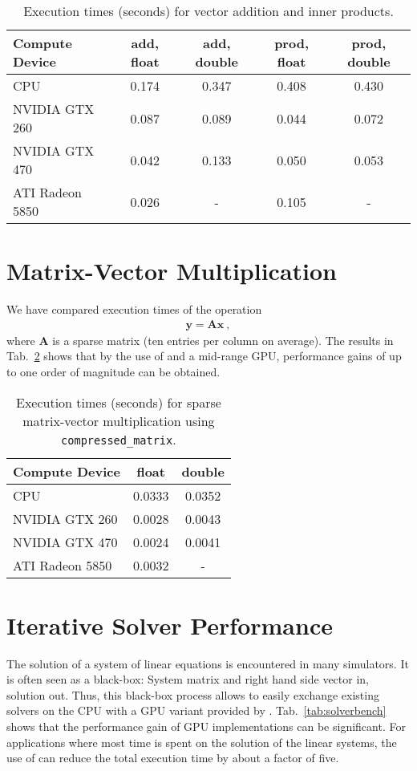 \begin{table}[tb]
\begin{center}
\begin{tabular}{l|c|c|c|c}
Compute Device & add, float & add, double & prod, float & prod, double\\
\hline
CPU             & 0.174 & 0.347 & 0.408 & 0.430 \\
NVIDIA GTX 260  & 0.087 & 0.089 & 0.044 & 0.072\\
NVIDIA GTX 470  & 0.042 & 0.133 & 0.050 & 0.053 \\
ATI Radeon 5850 & 0.026 & -     & 0.105 &   -      \\
\end{tabular}
\caption{Execution times (seconds) for vector addition and inner products.}
\label{tab:vectorbench}
\end{center}
\end{table}


\section{Matrix-Vector Multiplication}
We have compared execution times of the operation
\begin{align}
 \mathbf{y} = \mathbf{A} \mathbf{x} \ ,
\end{align}
where $\mathbf{A}$ is a sparse matrix (ten entries per column on average). The results in Tab.~\ref{tab:sparsebench} shows that by the use of {\ViennaCL} and a mid-range GPU, performance gains of up to one order of magnitude can be obtained.

\begin{table}[tb]
\begin{center}
\begin{tabular}{l|c|c}
Compute Device & float & double \\
\hline
CPU             & 0.0333 & 0.0352 \\
NVIDIA GTX 260  & 0.0028 & 0.0043 \\
NVIDIA GTX 470  & 0.0024 & 0.0041 \\
ATI Radeon 5850 & 0.0032 & - \\
\end{tabular}
\caption{Execution times (seconds) for sparse matrix-vector multiplication using \texttt{compressed\_matrix}.}
\label{tab:sparsebench}
\end{center}
\end{table}

\section{Iterative Solver Performance}
The solution of a system of linear equations is encountered in many simulators. It is often seen as a black-box: System matrix and right hand side vector in, solution out. Thus, this black-box process allows to easily exchange existing solvers on the CPU with a GPU variant provided by {\ViennaCL}. Tab.~\ref{tab:solverbench} shows that the performance gain of GPU implementations can be significant. For applications where most time is spent on the solution of the linear systems, the use of {\ViennaCL} can reduce the total execution time by about a factor of five.

